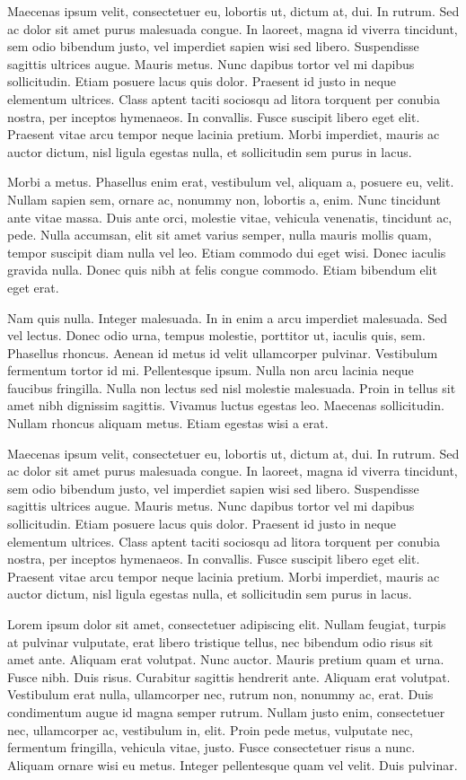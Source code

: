Maecenas ipsum velit, consectetuer eu, lobortis ut, dictum at, dui. In rutrum. Sed ac dolor sit amet purus malesuada congue. In laoreet, magna id viverra tincidunt, sem odio bibendum justo, vel imperdiet sapien wisi sed libero. Suspendisse sagittis ultrices augue. Mauris metus. Nunc dapibus tortor vel mi dapibus sollicitudin. Etiam posuere lacus quis dolor. Praesent id justo in neque elementum ultrices. Class aptent taciti sociosqu ad litora torquent per conubia nostra, per inceptos hymenaeos. In convallis. Fusce suscipit libero eget elit. Praesent vitae arcu tempor neque lacinia pretium. Morbi imperdiet, mauris ac auctor dictum, nisl ligula egestas nulla, et sollicitudin sem purus in lacus.

Morbi a metus. Phasellus enim erat, vestibulum vel, aliquam a, posuere eu, velit. Nullam sapien sem, ornare ac, nonummy non, lobortis a, enim. Nunc tincidunt ante vitae massa. Duis ante orci, molestie vitae, vehicula venenatis, tincidunt ac, pede. Nulla accumsan, elit sit amet varius semper, nulla mauris mollis quam, tempor suscipit diam nulla vel leo. Etiam commodo dui eget wisi. Donec iaculis gravida nulla. Donec quis nibh at felis congue commodo. Etiam bibendum elit eget erat.

Nam quis nulla. Integer malesuada. In in enim a arcu imperdiet malesuada. Sed vel lectus. Donec odio urna, tempus molestie, porttitor ut, iaculis quis, sem. Phasellus rhoncus. Aenean id metus id velit ullamcorper pulvinar. Vestibulum fermentum tortor id mi. Pellentesque ipsum. Nulla non arcu lacinia neque faucibus fringilla. Nulla non lectus sed nisl molestie malesuada. Proin in tellus sit amet nibh dignissim sagittis. Vivamus luctus egestas leo. Maecenas sollicitudin. Nullam rhoncus aliquam metus. Etiam egestas wisi a erat.

Maecenas ipsum velit, consectetuer eu, lobortis ut, dictum at, dui. In rutrum. Sed ac dolor sit amet purus malesuada congue. In laoreet, magna id viverra tincidunt, sem odio bibendum justo, vel imperdiet sapien wisi sed libero. Suspendisse sagittis ultrices augue. Mauris metus. Nunc dapibus tortor vel mi dapibus sollicitudin. Etiam posuere lacus quis dolor. Praesent id justo in neque elementum ultrices. Class aptent taciti sociosqu ad litora torquent per conubia nostra, per inceptos hymenaeos. In convallis. Fusce suscipit libero eget elit. Praesent vitae arcu tempor neque lacinia pretium. Morbi imperdiet, mauris ac auctor dictum, nisl ligula egestas nulla, et sollicitudin sem purus in lacus.

Lorem ipsum dolor sit amet, consectetuer adipiscing elit. Nullam feugiat, turpis at pulvinar vulputate, erat libero tristique tellus, nec bibendum odio risus sit amet ante. Aliquam erat volutpat. Nunc auctor. Mauris pretium quam et urna. Fusce nibh. Duis risus. Curabitur sagittis hendrerit ante. Aliquam erat volutpat. Vestibulum erat nulla, ullamcorper nec, rutrum non, nonummy ac, erat. Duis condimentum augue id magna semper rutrum. Nullam justo enim, consectetuer nec, ullamcorper ac, vestibulum in, elit. Proin pede metus, vulputate nec, fermentum fringilla, vehicula vitae, justo. Fusce consectetuer risus a nunc. Aliquam ornare wisi eu metus. Integer pellentesque quam vel velit. Duis pulvinar.

